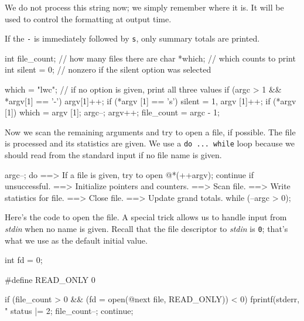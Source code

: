 \documentclass[11pt,a4paper]{article}
\begin{document}
We do not process this string now; we simply remember where it is. It will be used to control the
formatting at output time.

If the \texttt{-} is immediately followed by \texttt{s}, only summary totals are printed.

\begin{code}[language=c,name={Variables local to main}]
int file_count;  // how many files there are
char *which;     // which counts to print
int silent = 0;  // nonzero if the silent option was selected
\end{code}

\begin{code}[language=c,name={Set up option selection}]
which = "lwc";   // if no option is given, print all three values
if (argc > 1 && *argv[1] == '-') {
    argv[1]++;
    if (*argv [1] == 's') silent = 1, argv [1]++;
    if (*argv [1]) which = argv [1];
    argc--;
    argv++;
}
file_count = argc - 1;
\end{code}

Now we scan the remaining arguments and try to open a file, if possible. The file is processed and
its statistics are given. We use a \texttt{do ... while} loop because we should read from the
standard input if no file name is given.

\begin{code}[language=c,name={Process all the files}]
argc--;
do {
    ==> If a file is given, try to open @{*(++argv)}; continue if unsuccessful.
    ==> Initialize pointers and counters.
    ==> Scan file.
    ==> Write statistics for file.
    ==> Close file.
    ==> Update grand totals.
} while (--argc > 0);
\end{code}

Here's the code to open the file. A special trick allows us to handle input from \emph{stdin} when
no name is given. Recall that the file descriptor to \emph{stdin} is \texttt{0}; that's what we use
as the default initial value.

\begin{code}[language=c,name={Variables local to main}]
int fd = 0;
\end{code}

\begin{code}[language=c,name={Preprocessor definitions}]
#define READ_ONLY 0
\end{code}

\begin{code}[language=c,name={If a file is given, try to open @\{\}; continue if unsuccessful}]
if (file_count > 0 && (fd = open(@{next file}, READ_ONLY)) < 0) {
    fprintf(stderr, "%
    status |= 2;
    file_count--;
    continue;
}
\end{code}
\end{document}
